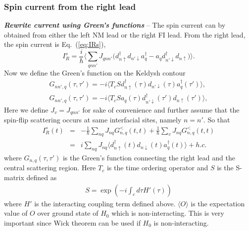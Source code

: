\documentclass[aps,prb,superscriptaddress]{revtex4-2}
\begin{document}
\subsubsection{Spin current from the right lead}
{\noindent \textbf{\textit{Rewrite current using Green's functions}}} -- The spin current can by obtained from either the left NM lead or the right FI lead. From the right lead, the spin current is Eq.~(\ref{eq:IRs}),
\begin{equation}
I_R^s = \frac{i}{\hbar} \langle \sum_{qnn'} J_{qnn'} \big( d_{n\uparrow}^{\dag}d_{n'\downarrow}a_{q}^{\dag} - a_{q}d_{n'\downarrow}^{\dag}d_{n\uparrow} \big)\rangle.
\end{equation}
Now we define the Green's function on the Keldysh contour
\begin{gather}\label{lesser1}
G_{nn',q}(\tau,\tau') = -i \langle T_c S d^{\dagger}_{n\uparrow}(\tau) d_{n'\downarrow}(\tau)a^{\dagger}_{q}(\tau') \rangle ,\\
G_{nn',q}(\tau,\tau') = -i \langle T_c S a_{q}(\tau)d^{\dagger}_{n'\downarrow}(\tau') d_{n\uparrow}(\tau')  \rangle,
\end{gather}
Here we define $J_v=J_{qnn'}$ for sake of convenience and further assume that the spin-flip scattering occurs at same interfacial sites, namely $n=n'$. So that
\begin{eqnarray}\label{eq:IRs2}
I_R^s(t) &=& - \frac{1}{\hbar}\sum_{nq} J_{nq} G_{n,q}^<(t,t)+\frac{1}{\hbar}\sum_v J_{nq}  G_{n,q}^<(t,t)\nonumber \\
&=& i\sum_{nq} J_{nq} \langle d^{\dagger}_{n\uparrow}(t) d_{n\downarrow}(t)a^{\dagger}_{q}(t) \rangle +h.c.\label{lesser}
\end{eqnarray}
where $G_{n,q}(\tau,\tau')$ is the Green's function connecting the right lead and the central scattering region. Here $T_c$ is the time ordering operator and $S$ is the S-matrix defined as
\begin{gather}
S = \exp(-i\int_c d\tau H'(\tau)) \nonumber
\end{gather}
where $H'$ is the interacting coupling term defined above. $\langle O \rangle$ is the expectation value of $O$ over ground state of $H_0$ which is non-interacting. This is very important since Wick theorem can be used if $H_{0}$ is non-interacting.
\end{document}
